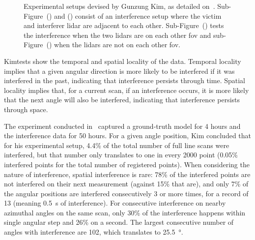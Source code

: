 \begin{figure}[!ht]
	\caption[Experimental setups used by Kim\etal and Popko\etal for 2D \ac{lidar} interference studies.]{Experimental setups devised by Gunzung Kim\etal, as detailed on~\cite{Kim2017}. Sub-Figure~() and () consist of an interference setup where the victim and interferer \ac{lidar} are adjacent to each other. Sub-Figure~() tests the interference when the two \acp{lidar} are on each other \ac{fov} and sub-Figure~() when the \acp{lidar} are not on each other \ac{fov}.}
	\label{fig:kim-setups}
\end{figure}



Kim\etal tests show the temporal and spatial locality of the data. Temporal locality implies that a given angular direction is more likely to be interfered if it was interfered in the past, indicating that interference persists through time. Spatial locality implies that, for a current scan, if an interference occurs, it is more likely that the next angle will also be interfered, indicating that interference persists through space. 

The experiment conducted in~\cite{Kim2015a} captured a ground-truth model for 4 hours and the interference data for 50 hours. For a given angle position, Kim concluded that for his experimental setup, 4.4\% of the total number of full line scans were interfered, but that number only translates to one in every 2000 point (0.05\% interfered points for the total number of registered points). When considering the nature of interference, spatial interference is rare: 78\% of the interfered points are not interfered on their next measurement (against 15\% that are), and only 7\% of the angular positions are interfered consecutively 3 or more times, for a record of 13 (meaning \SI{0.5}{\second} of interference). For consecutive interference on nearby azimuthal angles on the same scan, only 30\% of the interference happens within single angular step and 26\% on a second. The largest consecutive number of angles with interference are 102, which translates to \SI{25.5}{\degree}.

